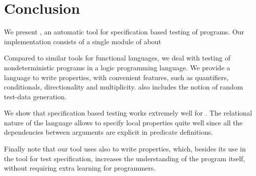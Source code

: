 
\section{Conclusion}
\label{sec:conclusion}



We present \plqc{}, an automatic tool for specification based
testing of \Prolog{} programs.
%
Our implementation consists of a single \Prolog{} module of about


Compared to similar tools for functional languages, we deal with testing
of nondeterministic programs in a logic programming language.
%
We provide a language to write properties, with convenient features,
such as quantifiers, conditionals, directionality and multiplicity.
%
\plqc{} also includes the notion of random test-data generation.
%


We show that specification based testing works extremely well for
\Prolog.
%
The relational nature of the language allows to specify local properties
quite well since all the dependencies between arguments are explicit in
predicate definitions.


Finally note that our tool uses \Prolog{} also to write properties, which,
besides its use in the tool for test specification, increases the
understanding of the program itself, without requiring extra learning for
\Prolog{} programmers.
